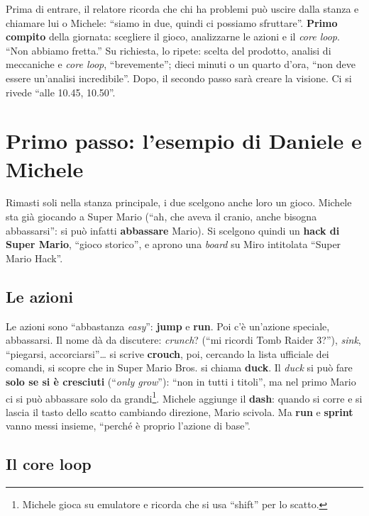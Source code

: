 Prima di entrare, il relatore ricorda che chi ha problemi può uscire dalla
stanza e chiamare lui o Michele: ``siamo in due, quindi ci possiamo sfruttare''.
\textbf{Primo compito} della giornata: scegliere il gioco, analizzarne le azioni e
il \emph{core loop}. ``Non abbiamo fretta.'' Su richiesta, lo ripete: scelta del
prodotto, analisi di meccaniche e \emph{core loop}, ``brevemente''; dieci minuti o
un quarto d'ora, ``non deve essere un'analisi incredibile''. Dopo, il secondo
passo sarà creare la visione. Ci si rivede ``alle 10.45, 10.50''.

\section{Primo passo: l'esempio di Daniele e Michele}
\label{z7:sec:analisi-esempio}

Rimasti soli nella stanza principale, i due scelgono anche loro un gioco. Michele
sta già giocando a Super Mario (``ah, che aveva il cranio, anche bisogna
abbassarsi'': si può infatti \textbf{abbassare} Mario). Si scelgono quindi un
\textbf{hack di Super Mario}, ``gioco storico'', e aprono una \emph{board} su
Miro intitolata ``Super Mario Hack''.

\subsection{Le azioni}

Le azioni sono ``abbastanza \emph{easy}'': \textbf{jump} e \textbf{run}. Poi c'è
un'azione speciale, abbassarsi. Il nome dà da discutere: \emph{crunch}? (``mi
ricordi Tomb Raider 3?''), \emph{sink}, ``piegarsi, accorciarsi''\dots{} si
scrive \textbf{crouch}, poi, cercando la lista ufficiale dei comandi, si scopre
che in Super Mario Bros. si chiama \textbf{duck}. Il \emph{duck} si può fare
\textbf{solo se si è cresciuti} (``\emph{only grow}''): ``non in tutti i titoli'',
ma nel primo Mario ci si può abbassare solo da grandi\footnote{Michele gioca su
emulatore e ricorda che si usa ``shift'' per lo scatto.}. Michele aggiunge il
\textbf{dash}: quando si corre e si lascia il tasto dello scatto cambiando
direzione, Mario scivola. Ma \textbf{run} e \textbf{sprint} vanno messi insieme,
``perché è proprio l'azione di base''.

\subsection{Il core loop}

